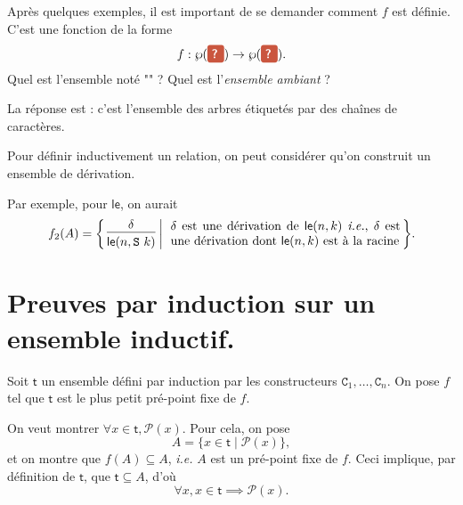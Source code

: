\documentclass[../main]{subfiles}
\begin{document}
  \begin{rmk}
    Après quelques exemples, il est important de se demander comment $f$ est définie.
    C'est une fonction de la forme \[
      f : \wp( \redQuestionBox) \to \wp( \redQuestionBox)
    .\]
    Quel est l'ensemble noté "\redQuestionBox" ? Quel est l'\textit{ensemble ambiant} ?

    La réponse est : c'est l'ensemble des arbres étiquetés par des chaînes de caractères.
  \end{rmk}

  \begin{rmk}
    Pour définir inductivement un relation, on peut considérer qu'on construit un ensemble de dérivation.

    Par exemple, pour $\mathsf{le}$, on aurait \[
    f_2(A) = \mleft\{\,
    \begin{prooftree}
      \hypo{\delta}
      \infer 1{\mathsf{le}(n, \mathtt{S}\ k)}
    \end{prooftree}\;\middle|\; \text{
    \parbox{6.5cm}{
      $\delta$ est une dérivation de $\mathsf{le}(n,k)$ \textit{i.e.}, $\delta$ est une dérivation dont $\mathsf{le}(n,k)$ est à la racine
    }}\,\mright\}
    .\] 
  \end{rmk}

  \section{Preuves par induction sur un ensemble inductif.}

  \begin{rmk}\label{rmk:rel-indu-naif}
    Soit $\mathsf{t}$ un ensemble défini par induction par les constructeurs $\mathtt{C}_1, \ldots, \mathtt{C}_n$.
    On pose $f$ tel que $\mathsf{t}$ est le plus petit pré-point fixe de $f$.

    On veut montrer $\forall x \in \mathsf{t}, \mathcal{P}(x)$.
    Pour cela, on pose \[
    A = \{x \in \mathsf{t}  \mid \mathcal{P}(x)\} 
    ,\] et on montre que $f(A) \subseteq A$, \textit{i.e.} $A$ est un pré-point fixe de $f$.
    Ceci implique, par définition de  $\mathsf{t}$, que $\mathsf{t} \subseteq A$, d'où \[
    \forall x, x \in \mathsf{t} \implies \mathcal{P}(x)
    .\] 
  \end{rmk}
\end{document}
